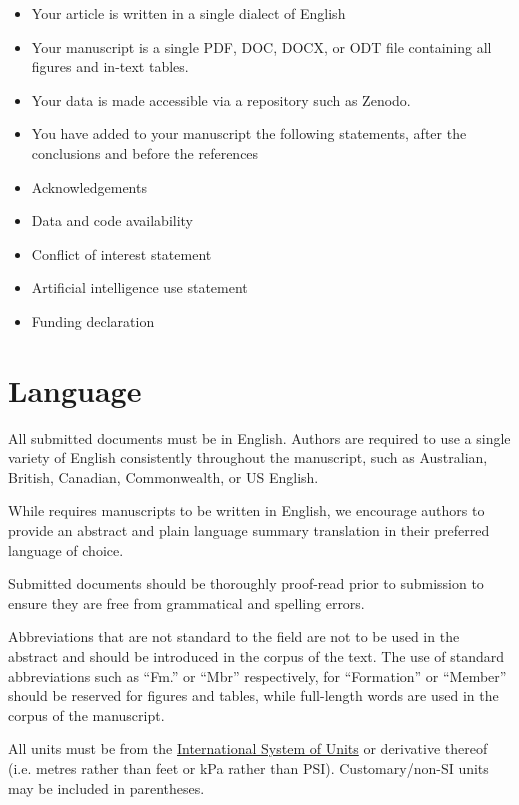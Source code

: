 \documentclass[submission, anonymous]{sedimentologika}
\begin{document}
\begin{itemize}
  \item Your article is written in a single dialect of English
  \item Your manuscript is a single PDF, DOC, DOCX, or ODT file containing all figures and in-text tables.
  \item Your data is made accessible via a repository such as Zenodo.
  \item You have added to your manuscript the following statements, after the conclusions and before the references
  \item Acknowledgements
  \item Data and code availability
  \item Conflict of interest statement
  \item Artificial intelligence use statement
  \item Funding declaration
\end{itemize}

\section{Language}

All submitted documents must be in English.
Authors are required to use a single variety of English consistently throughout the manuscript, such as Australian, British, Canadian, Commonwealth, or US English.

While \Sedimentologika\space requires manuscripts to be written in English, we encourage authors to provide an abstract and plain language summary translation in their preferred language of choice.

Submitted documents should be thoroughly proof-read prior to submission to ensure they are free from grammatical and spelling errors.

Abbreviations that are not standard to the field are not to be used in the abstract and should be introduced in the corpus of the text.
The use of standard abbreviations such as “Fm.” or “Mbr” respectively, for “Formation” or “Member” should be reserved for figures and tables, while full-length words are used in the corpus of the manuscript.

All units must be from the \href{https://www.bipm.org/en/measurement-units}{International System of Units} or derivative thereof (i.e. metres rather than feet or kPa rather than PSI).
Customary/non-SI units may be included in parentheses.
\end{document}

